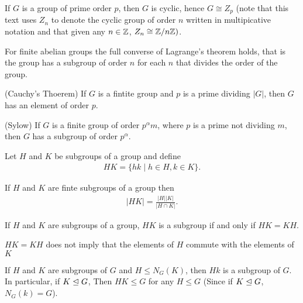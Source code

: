 \documentclass[../main]{subfiles}
\begin{document}
  
  \begin{cor}
   If $G$ is a group of prime order  $p$, then $G$ is cyclic, hence $G \cong Z_p$ (note that this text uses $Z_n$ to denote the cyclic group of order $n$ written in multipicative notation and that given any $n\in \mathbb{Z}$, $Z_n \cong \mathbb{Z}/n\mathbb{Z})$.
  \end{cor}
  
  
  \begin{nt}
   For finite abelian groups the full converse of Lagrange's theorem holds, that is the group has a subgroup of order $n$ for each $n$ that divides the order of the group. 
  \end{nt}
  
  
  \begin{thm}
   (Cauchy's Thoerem) If $G$ is a fintite group and $p$ is a prime dividing $|G|$, then $G$ has an element of order $p$.
  \end{thm}
  
  
  \begin{thm}
   (Sylow) If $G$ is a finite group of order $p^\alpha m$, where $p$ is a prime not dividing $m$, then $G$ has a subgroup of order $p^\alpha$.
  \end{thm}
  
  
  \begin{dfn}
   Let $H$ and $K$ be subgroups of a group and define
   \begin{align*}
    HK = \{hk \mid h\in H, k\in K\}.
   \end{align*}
  \end{dfn}
  
  
  \begin{prop}
   If $H$ and $K$ are finte subgroups of a group then 
   \begin{align*}
    |HK|=\frac{|H||K|}{|H\cap K|}.
   \end{align*}
  \end{prop}
  
  
  \begin{prop}
   If $H$ and $K$ are subgroups of a group, $HK$ is a subgroup if and only if $HK=KH$.
  \end{prop}
  
  
  \begin{nt}
   $HK=KH$ does not imply that the elements of $H$ commute with the elements of $K$
  \end{nt}
  
  
  \begin{cor}
   If $H$ and $K$ are subgroups of $G$ and $H\leq N_G(K)$, then $Hk$ is a subgroup of $G$. In particular, if $K \trianglelefteq G$, Then $HK\leq G$ for any $H \leq G$ (Since if $K \trianglelefteq G$, $N_G(k)=G$).
  \end{cor}
  
\end{document}
